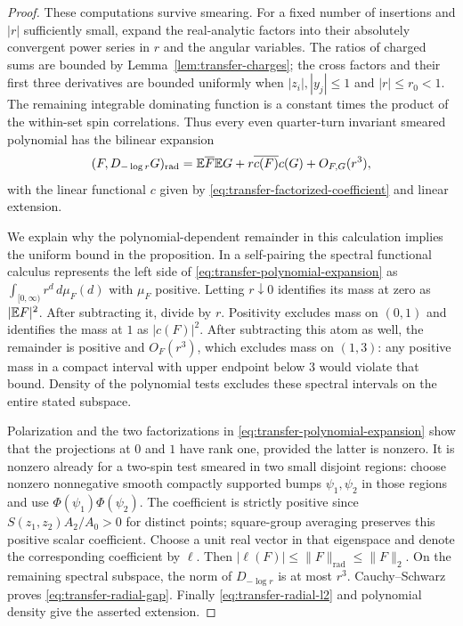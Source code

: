 \begin{proof}
These computations survive smearing.  For a fixed number of insertions
and $|r|$ sufficiently small, expand the real-analytic factors into
their absolutely convergent power series in $r$ and the angular
variables.  The ratios of charged sums are bounded by
Lemma~\ref{lem:transfer-charges}; the cross factors and their first
three derivatives are bounded uniformly when $|z_i|,|y_j|\leq1$ and
$|r|\leq r_0<1$.  The remaining integrable dominating function is a
constant times the product of the within-set spin correlations.
Thus every even quarter-turn invariant smeared polynomial has the
bilinear expansion
\begin{equation}
 (F,D_{-\log r}G)_{\mathrm{rad}}
   =\mathbb E\overline F\mathbb E G+r\overline{c(F)}c(G)+O_{F,G}(r^3),
 \label{eq:transfer-polynomial-expansion}
\end{equation}
with the linear functional $c$ given by
\eqref{eq:transfer-factorized-coefficient} and linear extension.

We explain why the polynomial-dependent remainder in this calculation
implies the uniform bound in the proposition.  In a self-pairing the
spectral functional calculus
\cite[Theorem~6.4.1 and Section~6.5, especially Theorem~6.5.4]{BuehlerSalamon2016}
represents the left side of \eqref{eq:transfer-polynomial-expansion} as
$\int_{[0,\infty)}r^d\,d\mu_F(d)$ with $\mu_F$ positive.
Letting $r\downarrow0$ identifies its mass at zero as $|\mathbb E F|^2$.
After subtracting it, divide by $r$.  Positivity excludes mass on
$(0,1)$ and identifies the mass at $1$ as $|c(F)|^2$.
After subtracting this atom as well, the remainder is positive and
$O_F(r^3)$, which excludes mass on $(1,3)$: any positive mass in a
compact interval with upper endpoint below $3$ would violate that
bound.  Density of the polynomial tests excludes these spectral
intervals on the entire stated subspace.

Polarization and the two factorizations in
\eqref{eq:transfer-polynomial-expansion} show that the projections at
$0$ and $1$ have rank one, provided the latter is nonzero.  It is
nonzero already for a two-spin test smeared in two small disjoint
regions: choose nonzero nonnegative smooth compactly supported bumps
$\psi_1,\psi_2$ in those regions and use
$\Phi(\psi_1)\Phi(\psi_2)$.  The coefficient is strictly positive
since $S(z_1,z_2)A_2/A_0>0$ for distinct points; square-group
averaging preserves this positive scalar coefficient.  Choose a unit real vector in that
eigenspace and denote the corresponding coefficient by $\ell$.
Then $|\ell(F)|\leq\|F\|_{\mathrm{rad}}\leq\|F\|_2$.
On the remaining spectral subspace, the norm of $D_{-\log r}$ is at
most $r^3$.  Cauchy--Schwarz proves
\eqref{eq:transfer-radial-gap}.  Finally
\eqref{eq:transfer-radial-l2} and polynomial density give the asserted
extension.
\end{proof}

